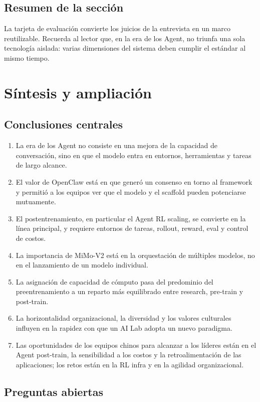 \documentclass[a4paper]{article}
\begin{document}
\subsection{Resumen de la sección}

La tarjeta de evaluación convierte los juicios de la entrevista en un marco reutilizable. Recuerda al lector que, en la era de los Agent, no triunfa una sola tecnología aislada: varias dimensiones del sistema deben cumplir el estándar al mismo tiempo.
\section{Síntesis y ampliación}

\subsection{Conclusiones centrales}

\begin{enumerate}
\item La era de los Agent no consiste en una mejora de la capacidad de conversación, sino en que el modelo entra en entornos, herramientas y tareas de largo alcance.
\item El valor de OpenClaw está en que generó un consenso en torno al framework y permitió a los equipos ver que el modelo y el scaffold pueden potenciarse mutuamente.
\item El postentrenamiento, en particular el Agent RL scaling, se convierte en la línea principal, y requiere entornos de tareas, rollout, reward, eval y control de costos.
\item La importancia de MiMo-V2 está en la orquestación de múltiples modelos, no en el lanzamiento de un modelo individual.
\item La asignación de capacidad de cómputo pasa del predominio del preentrenamiento a un reparto más equilibrado entre research, pre-train y post-train.
\item La horizontalidad organizacional, la diversidad y los valores culturales influyen en la rapidez con que un AI Lab adopta un nuevo paradigma.
\item Las oportunidades de los equipos chinos para alcanzar a los líderes están en el Agent post-train, la sensibilidad a los costos y la retroalimentación de las aplicaciones; los retos están en la RL infra y en la agilidad organizacional.
\end{enumerate}

\subsection{Preguntas abiertas}
\end{document}
